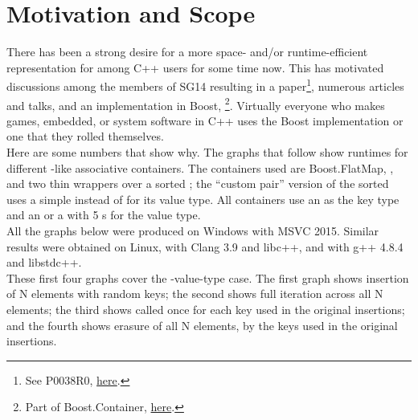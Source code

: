 \section{Motivation and Scope}

There has been a strong desire for a more space- and/or runtime-efficient
representation for  among C++ users for some time now.  This has
motivated discussions among the members of SG14 resulting in a
paper\footnote{See P0038R0,
  \href{http://www.open-std.org/jtc1/sc22/wg21/docs/papers/2015/p0038r0.html}{here}.},
numerous articles and talks, and an implementation in Boost,
\footnote{Part of Boost.Container,
  \href{http://www.boost.org/doc/libs/1_61_0/doc/html/container.html}{here}.}.
Virtually everyone who makes games, embedded, or system software in C++ uses
the Boost implementation or one that they rolled themselves.\\

Here are some numbers that show why.  The graphs that follow show runtimes for
different -like associative containers.  The containers used are
Boost.FlatMap, , and two thin wrappers over a sorted ;
the ``custom pair'' version of the sorted  uses a simple
 instead of  for its value type.  All containers use
an  as the key type and an  or a  with 5
s for the value type.\\

All the graphs below were produced on Windows with MSVC 2015.  Similar results
were obtained on Linux, with Clang 3.9 and libc++, and with g++ 4.8.4 and
libstdc++.\\

These first four graphs cover the -value-type case.  The first graph
shows insertion of N elements with random keys; the second shows full
iteration across all N elements; the third shows 
called once for each key used in the original insertions; and the fourth shows
erasure of all N elements, by the keys used in the original insertions.

